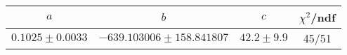 \begin{tabular}{c|c|c|c}
$a$ & $b$ & $c$ & $\chi^2$/ndf \\
\hline
$0.1025\pm0.0033$ & $-639.103006\pm158.841807$ & $42.2\pm9.9$ & 45/51
\end{tabular}
